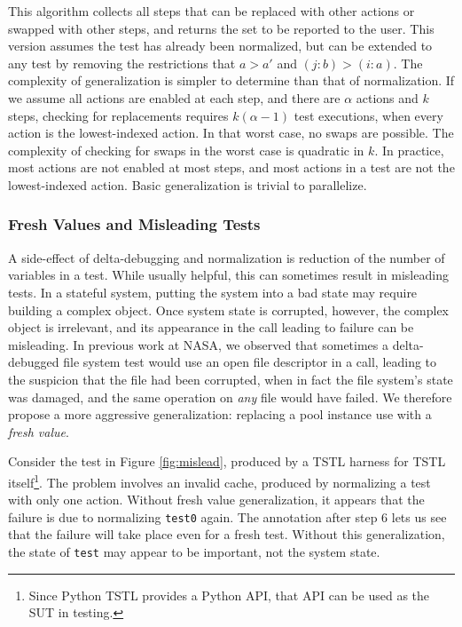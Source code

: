 This algorithm collects all steps that can be replaced with other
actions or swapped with other steps, and returns the set to be
reported to the user.  This version assumes the test has already been
normalized, but can be extended to any test by removing the
restrictions that $a > a'$ and $(j : b) > (i : a)$.  The complexity of
generalization is simpler to determine than that of normalization.  If
we assume all actions are enabled at each step, and there are $\alpha$
actions and $k$ steps, checking for replacements requires $k (\alpha-1)$
test executions, when every action is the lowest-indexed action.
In that worst case, no swaps are possible.  The complexity of checking
for swaps in the worst case is quadratic in $k$.  In practice, most
actions are not enabled at most steps, and most actions in a test
are not the lowest-indexed action.  Basic generalization is trivial to
parallelize.


\subsubsection{Fresh Values and Misleading Tests}
\label{freshgen}

A side-effect of delta-debugging and normalization is reduction of the
number of variables in a test.  While usually helpful, this can
sometimes result in misleading tests.  In a stateful system,
putting the system into a bad state may require building a complex
object.  Once system state is corrupted, however, the complex object
is irrelevant, and its appearance in the call leading to failure can
be misleading.  In previous work at NASA, we observed that sometimes a
delta-debugged file system test \cite{ICSEDiff,AMAI} would use an
open file descriptor in a call, leading to the suspicion that the file
had been corrupted, when in fact the file system's state was damaged,
and the same operation on \emph{any} file would have failed.
We therefore propose a more aggressive generalization: replacing a
pool instance use with a \emph{fresh value}.

Consider the test in Figure \ref{fig:mislead}, produced by a
TSTL harness for  TSTL itself\footnote{Since Python TSTL
  provides a Python API, that API can be used as the SUT in testing.}.  The
problem involves an invalid cache, produced by normalizing a test with
only one action.  Without fresh value generalization, it appears that
the failure is due to normalizing {\tt test0} again.
The annotation after step 6 lets us see that the failure
will take place even for a fresh test.
Without this generalization, the state of {\tt test} may
appear to be important, not the system state.

